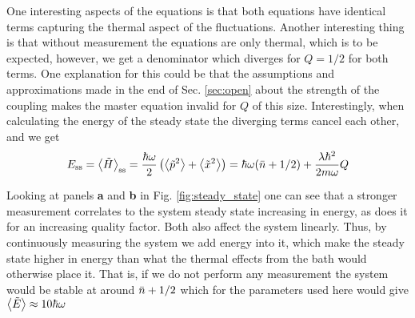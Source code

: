 One interesting aspects of the equations is that both equations have identical terms capturing the thermal aspect of the fluctuations. Another interesting thing is that without measurement the equations are only thermal, which is to be expected, however, we get a denominator which diverges for $Q=1/2$ for both terms. One explanation for this could be that the assumptions and approximations made in the end of Sec. \ref{sec:open} about the strength of the coupling makes the master equation invalid for $Q$ of this size. Interestingly, when calculating the energy of the steady state the diverging terms cancel each other, and we get
\begin{equation}
    E_\mathrm{ss} = \expval{\tilde{H}}_\mathrm{ss} = \frac{\hbar \omega}{2} \left( \expval{\tilde{p}^2} + \expval{\tilde{x}^2} \right) = \hbar\omega (\bar{n} + 1/2)+ \frac{\lambda \hbar^2}{2 m\omega} Q
    \label{eq:ess}
\end{equation}



Looking at panels \textbf{a} and \textbf{b} in Fig. \ref{fig:steady_state} one can see that a stronger measurement correlates to the system steady state increasing in energy, as does it for an increasing quality factor. Both also affect the system linearly. Thus, by continuously measuring the system we add energy into it, which make the steady state higher in energy than what the thermal effects from the bath would otherwise place it. That is, if we do not perform any measurement the system would be stable at around $\bar{n} + 1/2$ which for the parameters used here would give $\expval{\tilde{E}} \approx 10\hbar\omega$


